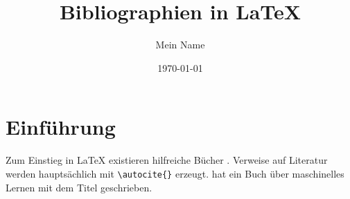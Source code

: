 \documentclass[oneside]{book}
\author{Mein Name}
\date{\today}
\title{Bibliographien in \LaTeX}
\begin{document}
\maketitle

\tableofcontents
\newpage

\chapter{Einführung}

Zum Einstieg in \LaTeX{} existieren hilfreiche Bücher \autocite{oetiker_2022}. Verweise auf Literatur werden hauptsächlich mit \verb|\autocite{}| erzeugt. \citeauthor{mitchell_machine_1997} hat \citeyear{mitchell_machine_1997} ein Buch\autocite{mitchell_machine_1997} über maschinelles Lernen mit dem Titel  geschrieben.

\newpage

\lipsum[1-3]

\printbibliography
\end{document}
